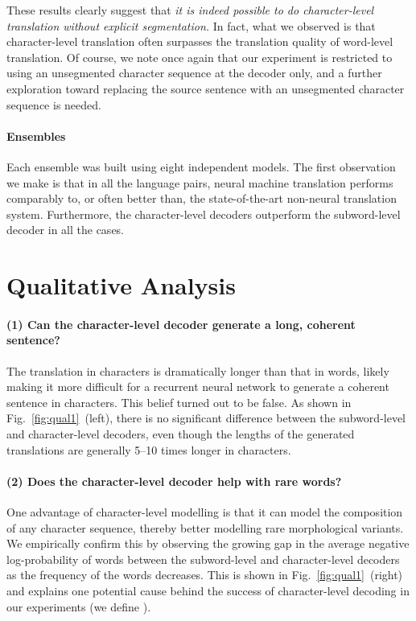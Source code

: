 \documentclass[11pt]{article}
\begin{document}
These results clearly suggest that
{\em it is indeed possible to do character-level translation without
explicit segmentation.} In fact, what we observed is that character-level
translation often surpasses the translation quality of
word-level translation. Of course, we note once again that our experiment is
restricted to using an unsegmented character sequence at the decoder only, and a
further exploration toward replacing the source sentence with an unsegmented
character sequence is needed.

\paragraph{Ensembles}
Each ensemble was built using eight independent models.
The first observation we make is that in all the language
pairs, neural machine translation performs comparably to, or often better than,
the state-of-the-art non-neural translation system. Furthermore, the
character-level decoders outperform the subword-level decoder in all the cases.

\section{Qualitative Analysis}

\paragraph{(1) Can the character-level decoder generate a long, coherent
sentence?}
The translation in characters is dramatically longer than that in words, likely
making it more difficult for a recurrent neural network to generate a coherent
sentence in characters. This belief turned out to be false.  As shown in
Fig.~\ref{fig:qual1}~(left), there is no significant difference between the
subword-level and character-level decoders, even though the lengths of the
generated translations are generally 5--10 times longer in characters.

\paragraph{(2) Does the character-level decoder help with rare words?}
One advantage of character-level modelling is that it can model the composition
of any character sequence, thereby better modelling rare morphological variants.
We empirically confirm this by observing the growing gap in the average negative
log-probability of words between the subword-level and character-level decoders
as the frequency of the words decreases. This is shown in
Fig.~\ref{fig:qual1}~(right) and explains one potential cause behind the success of
character-level decoding in our experiments (we define ).
\end{document}
